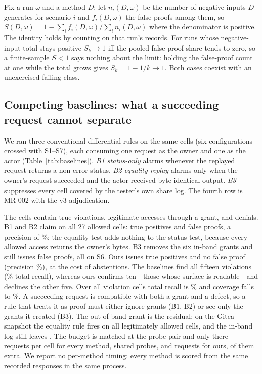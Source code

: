 Fix a run $\omega$ and a method $D$; let $n_i(D,\omega)$ be the number of negative inputs
$D$ generates for scenario $i$ and $f_i(D,\omega)$ the false proofs among them, so
$S(D,\omega)=1-\sum_i f_i(D,\omega)\big/\sum_i n_i(D,\omega)$ where the denominator is
positive. The identity holds by counting on that run's records. For runs whose
negative-input total stays positive $S_k\to 1$ iff the pooled false-proof share tends to
zero, so a finite-sample $S<1$ says nothing about the limit: holding the false-proof count
at one while the total grows gives $S_k=1-1/k\to1$. Both cases coexist with an unexercised
failing class.

\subsection{Competing baselines: what a succeeding request cannot separate}
\label{sec:baselines}

We ran three conventional differential rules on the same \BlCells{} cells (six
configurations crossed with S1--S7), each consuming one request as the owner and one as the
actor (Table~\ref{tab:baselines}). \emph{B1 status-only} alarms whenever the replayed
request returns a non-error status. \emph{B2 equality replay} alarms only when the owner's
request succeeded and the actor received byte-identical output. \emph{B3} suppresses every
cell covered by the tester's own share log. The fourth row is MR-002 with the v3
adjudication.

The cells contain \BlBolaCells{} true violations, \BlLegitCells{} legitimate accesses
through a grant, and \BlDeniedCells{} denials. B1 and B2 claim on all 27 allowed cells:
\BlBOneTP{} true positives and \BlBOneFP{} false proofs, a precision of
\BlBTwoPrecision{}\%; the equality test adds nothing to the status test, because every
allowed access returns the owner's bytes. B3 removes the six in-band grants and still
issues \BlBThreeFP{} false proofs, all on S6. Ours issues \BlOursTP{} true positives and no
false proof (precision \BlOursPrecision{}\%), at the cost of \BlOursAbstain{} abstentions.
The baselines find all fifteen violations (\BlBaselineRecallAll{}\% total recall), whereas
ours confirms ten---those whose surface is readable---and declines the other five. Over all
\BlBolaCells{} violation cells total recall is \BlOursRecallAll{}\% and coverage falls to
\BlOursCoverage{}\%. A succeeding request is compatible with both a grant and a defect, so a
rule that treats it as proof must either ignore grants (B1, B2) or see only the grants it
created (B3). The out-of-band grant is the residual: on the Gitea snapshot the equality
rule fires on all \BlRsBTwoClaims{} legitimately allowed cells, and the in-band log still
leaves \BlRsBThreeClaims{}. The budget is matched at the probe pair and only
there---\BlProbeReq{} requests per cell for every method, \BlSharedProbes{} shared probes,
and \BlOursRequestsTotal{} requests for ours, \BlOursExtraTotal{} of them extra.
We report no per-method timing: every method is scored from the same recorded responses in
the same process.

